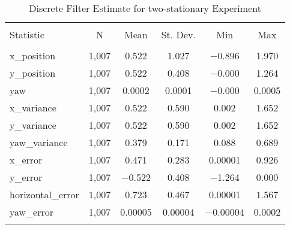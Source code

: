 
\begin{table}[h] \centering 
  \caption{Discrete Filter Estimate for two-stationary Experiment} 
  \label{tab:two_stationary_discrete_summary} 
\begin{tabular}{@{\extracolsep{5pt}}lccccc} 
\\[-1.8ex]\hline 
\hline \\[-1.8ex] 
Statistic & \multicolumn{1}{c}{N} & \multicolumn{1}{c}{Mean} & \multicolumn{1}{c}{St. Dev.} & \multicolumn{1}{c}{Min} & \multicolumn{1}{c}{Max} \\ 
\hline \\[-1.8ex] 
x\_position & 1,007 & 0.522 & 1.027 & $-$0.896 & 1.970 \\ 
y\_position & 1,007 & 0.522 & 0.408 & $-$0.000 & 1.264 \\ 
yaw & 1,007 & 0.0002 & 0.0001 & $-$0.000 & 0.0005 \\ 
x\_variance & 1,007 & 0.522 & 0.590 & 0.002 & 1.652 \\ 
y\_variance & 1,007 & 0.522 & 0.590 & 0.002 & 1.652 \\ 
yaw\_variance & 1,007 & 0.379 & 0.171 & 0.088 & 0.689 \\ 
x\_error & 1,007 & 0.471 & 0.283 & 0.00001 & 0.926 \\ 
y\_error & 1,007 & $-$0.522 & 0.408 & $-$1.264 & 0.000 \\ 
horizontal\_error & 1,007 & 0.723 & 0.467 & 0.00001 & 1.567 \\ 
yaw\_error & 1,007 & 0.00005 & 0.00004 & $-$0.00004 & 0.0002 \\ 
\hline \\[-1.8ex] 
\end{tabular} 
\end{table} 
